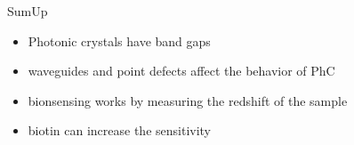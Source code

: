 \begin{frame}{SumUp}
  \begin{itemize}
    \setlength\itemsep{1.2em}
    \item{Photonic crystals have band gaps}
    \item{waveguides and point defects affect the behavior of PhC}
    \item{bionsensing works by measuring the redshift of the sample }
    \item{biotin can increase the sensitivity}
  \end{itemize}
\end{frame}


